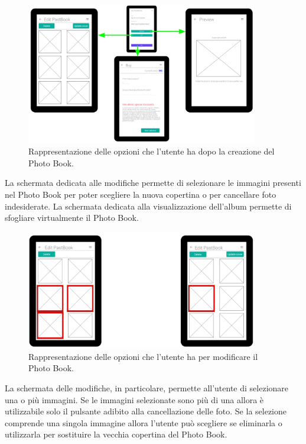				\begin{figure}[H]
					\centering
					\includegraphics[width=0.9\textwidth]{capitolo_3/immagini/wireframe_2.png}
					\caption{Rappresentazione delle opzioni che l'utente ha dopo la creazione del Photo Book.}
				\end{figure}
				\noindent La schermata dedicata alle modifiche permette di selezionare le immagini presenti nel Photo Book per poter
				scegliere la nuova copertina o per cancellare foto indesiderate. La schermata dedicata alla visualizzazione
				dell'album permette di sfogliare virtualmente il Photo Book.
				\begin{figure}[H]
					\centering
					\includegraphics[width=0.9\textwidth]{capitolo_3/immagini/wireframe_3.png}
					\caption{Rappresentazione delle opzioni che l'utente ha per modificare il Photo Book.}
				\end{figure}
				\noindent La schermata delle modifiche, in particolare, permette all'utente di selezionare una o più immagini. Se le
				immagini selezionate sono più di una allora è utilizzabile solo il pulsante adibito alla cancellazione delle foto.
				Se la selezione comprende una singola immagine allora l'utente può scegliere se eliminarla o utilizzarla per
				sostituire la vecchia copertina del Photo Book.
